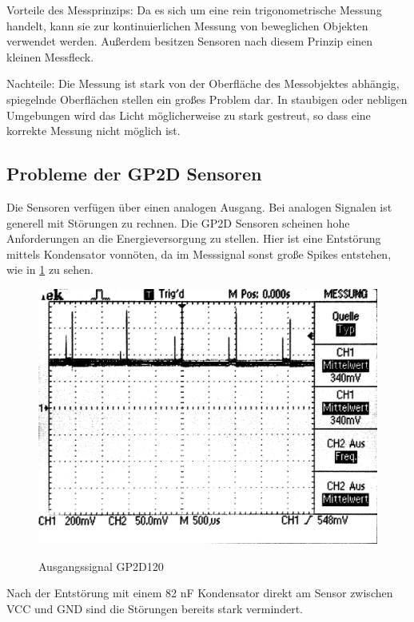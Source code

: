 Vorteile des Messprinzips:
Da es sich um eine rein trigonometrische Messung handelt, kann sie zur kontinuierlichen Messung von beweglichen Objekten verwendet werden.
Außerdem besitzen Sensoren nach diesem Prinzip einen kleinen Messfleck.

Nachteile:
Die Messung ist stark von der Oberfläche des Messobjektes abhängig, spiegelnde Oberflächen stellen ein großes Problem dar.
In staubigen oder nebligen Umgebungen wird das Licht möglicherweise zu stark gestreut, so dass eine korrekte Messung nicht möglich ist.

\subsection{Probleme der GP2D Sensoren}
Die Sensoren verfügen über einen analogen Ausgang. Bei analogen Signalen ist generell mit Störungen zu rechnen. Die GP2D Sensoren scheinen
hohe Anforderungen an die Energieversorgung zu stellen. Hier ist eine Entstörung mittels Kondensator vonnöten, da im Messsignal sonst große Spikes
entstehen, wie in \cref{fig:IR_spikes} zu sehen.

\begin{figure}[H]
\centering
\includegraphics[width=.8\textwidth]{IR_spikes.png}\\
\caption{Ausgangssignal GP2D120}%
\label{fig:IR_spikes}
\end{figure}

Nach der Entstörung mit einem 82 nF Kondensator direkt am Sensor zwischen VCC und GND sind die Störungen bereits stark vermindert.

